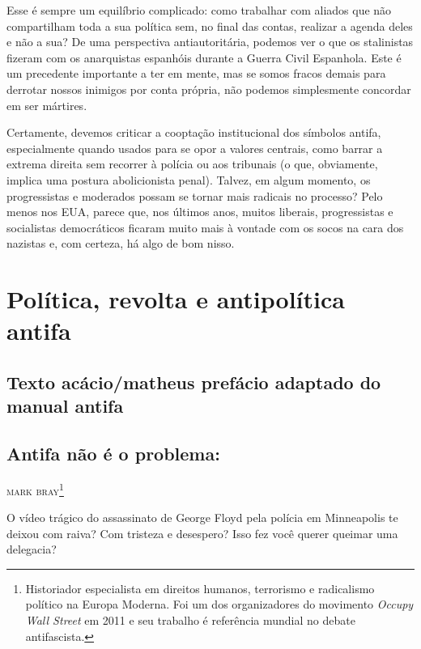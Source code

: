 Esse é sempre um equilíbrio complicado: como trabalhar com aliados que não compartilham toda a sua política sem, no final das contas, realizar a agenda deles e não a sua? De uma perspectiva antiautoritária, podemos ver o que os stalinistas fizeram com os anarquistas espanhóis durante a Guerra Civil Espanhola. Este é um precedente importante a ter em mente, mas se somos fracos demais para derrotar nossos inimigos por conta própria, não podemos simplesmente concordar em ser mártires. 

Certamente, devemos criticar a cooptação institucional dos símbolos antifa, especialmente quando usados para se opor a valores centrais, como barrar a extrema direita sem recorrer à polícia ou aos tribunais (o que, obviamente, implica uma postura abolicionista penal). Talvez, em algum momento, os progressistas e moderados possam se tornar mais radicais no processo? Pelo menos nos EUA, parece que, nos últimos anos, muitos liberais, progressistas e socialistas democráticos ficaram muito mais à vontade com os socos na cara dos nazistas e, com certeza, há algo de bom nisso.

\part{Política, revolta e antipolítica antifa}

\chapter{Texto acácio/matheus prefácio adaptado do manual antifa}

\lipsum[5]

\chapter*{Antifa não é o problema: }


\hfill{}\textsc{mark bray\footnote{Historiador especialista em direitos humanos, terrorismo e radicalismo político na Europa Moderna. Foi um dos organizadores do movimento \emph{Occupy Wall Street} em 2011 e seu trabalho é referência mundial no debate antifascista.}}

\bigskip

O vídeo trágico do assassinato de George Floyd pela polícia em Minneapolis te deixou com raiva? Com tristeza e desespero? Isso fez você querer queimar uma delegacia?
 
